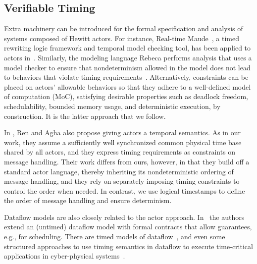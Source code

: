 \documentclass[sigconf]{acmart}
\newcommand{\marten}[1]{\mynote{Marten}{#1}{cyan}}%
\newcommand{\marjan}[1]{\mynote{Marjan}{#1}{magenta}}%
\begin{document}
\subsection{Verifiable Timing}\label{sec:related}
Extra machinery can be introduced for the formal specification and analysis of systems composed of Hewitt actors.
For instance, Real-time Maude~\cite{olveczky:2008:real}, a timed rewriting logic framework and temporal model checking tool, has been applied to actors in~\cite{Ding2003}.
Similarly, the modeling language Rebeca performs analysis that uses a model checker to ensure that nondeterminism allowed in the model does not lead to behaviors that violate timing requirements~\cite{KHAMESPANAH2015184}.
Alternatively, constraints can be placed on actors' allowable behaviors so that they adhere to a well-defined model of computation (MoC), satisfying desirable properties such as deadlock freedom, schedulability, bounded memory usage, and deterministic execution, by construction. It is the latter approach that we follow.

In \cite{ren1995rtsynchronizer}, Ren and Agha also propose giving actors a temporal
semantics. As in our work, they assume a sufficiently well synchronized
common physical time base shared by all actors, and they express timing
requirements as constraints on message handling. Their work differs from
ours, however, in that they build off a standard actor language, thereby
inheriting its nondeterministic ordering of message handling, and they
rely on separately imposing timing constraints to control the order when
needed. In contrast, we use logical timestamps to define the order of
message handling and ensure determinism.

Dataflow models are also closely related to the actor approach. In~\cite{wiik2018contract} the authors extend an (untimed) dataflow model with formal contracts that allow guarantees, e.g., for scheduling.
There are timed models of dataflow~\cite{Sriram:00:Scheduling}, and even some structured approaches to use timing semantics in dataflow to execute time-critical applications in cyber-physical systems~\cite{GeilenEtAl:12:Scenarios}.
\end{document}
